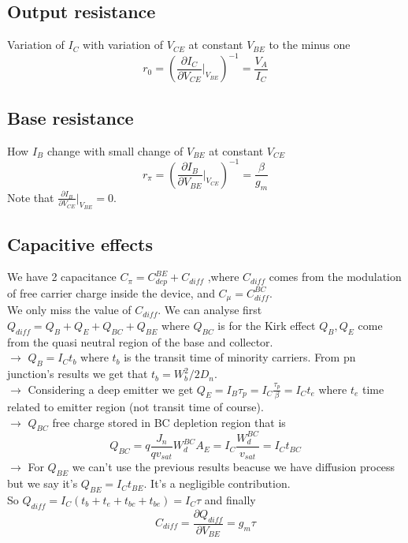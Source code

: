 \subsection{Output resistance}
Variation of $I_C$ with variation of $V_{CE}$ at constant $V_{BE}$ to the minus one 
\begin{equation}
r_0=\left(\frac{\partial I_C}{\partial V_{CE}}|_{V_{BE}}\right)^{-1}=\frac{V_A}{I_C}
\end{equation}

\subsection{Base resistance}
How $I_B$ change with small change of $V_{BE}$ at constant $V_{CE}$
\begin{equation}
r_{\pi}=\left(\frac{\partial I_B}{\partial V_{BE}}|_{V_{CE}}\right)^{-1}=\frac{\beta}{g_m}
\end{equation}
Note that $\frac{\partial I_B}{\partial V_{CE}}|_{V_{BE}}=0$.\\

\subsection{Capacitive effects}
We have 2 capacitance $C_\pi=C_{dep}^{BE}+C_{diff}$ ,where $C_{diff}$ comes from the modulation of free carrier charge inside the device, and $C_\mu=C_{diff}^{BC}$.\\
We only miss the value of $C_{diff}$. We can analyse first $Q_{diff}=Q_B+Q_E+Q_{BC}+Q_{BE}$ where $Q_{BC}$ is for the Kirk effect $Q_B,Q_E$ come from the quasi neutral region of the base and collector.\\
\vspace{5mm}
$\rightarrow$ $Q_B=I_Ct_b$ where $t_b$ is the transit time of minority carriers. From pn junction's results we get that $t_b=W_b^2/2D_n$.\\
\vspace{2mm}
$\rightarrow$ Considering a deep emitter we get $Q_E=I_B\tau_p=I_C \frac{\tau_p}{\beta}=I_Ct_e$ where $t_e$ time related to emitter region (not transit time of course). \\
\vspace{2mm}
$\rightarrow$ $Q_{BC}$ free charge stored in BC depletion region that is
\begin{equation}
Q_{BC}=q \frac{J_n}{qv_{sat}}W_d^{BC}A_E=I_C \frac{W_d^{BC}}{v_{sat}}=I_C t_{BC}
\end{equation}
$\rightarrow$ For $Q_{BE}$ we can't use the previous results beacuse we have diffusion process but we say it's $Q_{BE}=I_Ct_{BE}$. It's a negligible contribution.\\
\vspace{5mm}
So $Q_{diff}=I_C(t_b+t_e+t_{bc}+t_{be})=I_C \tau$ and finally
\begin{equation}
C_{diff}=\frac{\partial Q_{diff}}{\partial V_{BE}}=g_m\tau
\end{equation}

